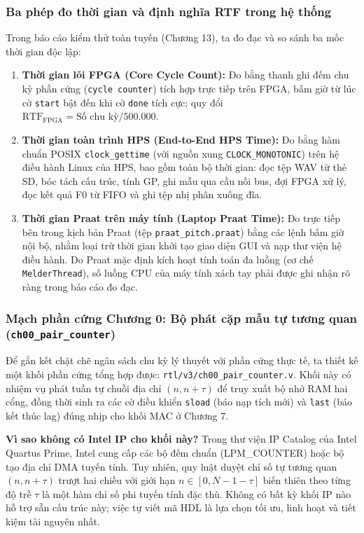 \subsubsection*{Ba phép đo thời gian và định nghĩa RTF trong hệ thống}
Trong báo cáo kiểm thử toàn tuyến (Chương 13), ta đo đạc và so sánh ba mốc thời gian độc lập:
\begin{enumerate}[leftmargin=1.5em, itemsep=2pt]
    \item \textbf{Thời gian lõi FPGA (Core Cycle Count):} Đo bằng thanh ghi đếm chu kỳ phần cứng (\texttt{cycle counter}) tích hợp trực tiếp trên FPGA, bấm giờ từ lúc cờ \texttt{start} bật đến khi cờ \texttt{done} tích cực; quy đổi $\text{RTF}_{\text{FPGA}} = \text{Số chu kỳ} / 500.000$.
    \item \textbf{Thời gian toàn trình HPS (End-to-End HPS Time):} Đo bằng hàm chuẩn POSIX \texttt{clock\_gettime} (với nguồn xung \texttt{CLOCK\_MONOTONIC}) trên hệ điều hành Linux của HPS, bao gồm toàn bộ thời gian: đọc tệp WAV từ thẻ SD, bóc tách cấu trúc, tính GP, ghi mẫu qua cầu nối bus, đợi FPGA xử lý, đọc kết quả F0 từ FIFO và ghi tệp nhị phân xuống đĩa.
    \item \textbf{Thời gian Praat trên máy tính (Laptop Praat Time):} Đo trực tiếp bên trong kịch bản Praat (tệp \texttt{praat\_}\linebreak[0]\texttt{pitch.praat}) bằng các lệnh bấm giờ nội bộ, nhằm loại trừ thời gian khởi tạo giao diện GUI và nạp thư viện hệ điều hành. Do Praat mặc định kích hoạt tính toán đa luồng (cơ chế \texttt{MelderThread}), số luồng CPU của máy tính xách tay phải được ghi nhận rõ ràng trong báo cáo đo đạc.
\end{enumerate}

\subsubsection*{Mạch phần cứng Chương 0: Bộ phát cặp mẫu tự tương quan (\texttt{ch00\_pair\_counter})}
Để gắn kết chặt chẽ ngân sách chu kỳ lý thuyết với phần cứng thực tế, ta thiết kế một khối phần cứng tổng hợp được: \texttt{rtl/v3/ch00\_pair\_counter.v}. Khối này có nhiệm vụ phát tuần tự chuỗi địa chỉ $(n, n+\tau)$ để truy xuất bộ nhớ RAM hai cổng, đồng thời sinh ra các cờ điều khiển \texttt{sload} (báo nạp tích mới) và \texttt{last} (báo kết thúc lag) đúng nhịp cho khối MAC ở Chương 7.

\textbf{Vì sao không có Intel IP cho khối này?}
Trong thư viện IP Catalog của Intel Quartus Prime, Intel cung cấp các bộ đếm chuẩn (LPM\_COUNTER) hoặc bộ tạo địa chỉ DMA tuyến tính. Tuy nhiên, quy luật duyệt chỉ số tự tương quan $(n, n+\tau)$ trượt hai chiều với giới hạn $n \in [0, N-1-\tau]$ biến thiên theo từng độ trễ $\tau$ là một hàm chỉ số phi tuyến tính đặc thù. Không có bất kỳ khối IP nào hỗ trợ sẵn cấu trúc này; việc tự viết mã HDL là lựa chọn tối ưu, linh hoạt và tiết kiệm tài nguyên nhất.

